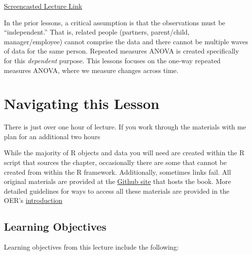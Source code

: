 \documentclass[
  11pt,
]{book}
\begin{document}
\href{https://spu.hosted.panopto.com/Panopto/Pages/Viewer.aspx?pid=c8f5737f-d00d-4fa4-ba3c-ad8b01762258}{Screencasted Lecture Link}

In the prior lessons, a critical assumption is that the observations must be ``independent.'' That is, related people (partners, parent/child, manager/employee) cannot comprise the data and there cannot be multiple waves of data for the same person. Repeated measures ANOVA is created specifically for this \emph{dependent} purpose. This lessons focuses on the one-way repeated measures ANOVA, where we measure changes across time.

\hypertarget{navigating-this-lesson-7}{%
\section{Navigating this Lesson}\label{navigating-this-lesson-7}}

There is just over one hour of lecture. If you work through the materials with me plan for an additional two hours

While the majority of R objects and data you will need are created within the R script that sources the chapter, occasionally there are some that cannot be created from within the R framework. Additionally, sometimes links fail. All original materials are provided at the \href{https://github.com/lhbikos/ReCenterPsychStats}{Github site} that hosts the book. More detailed guidelines for ways to access all these materials are provided in the OER's \protect\hyperlink{ReCintro}{introduction}

\hypertarget{learning-objectives-7}{%
\subsection{Learning Objectives}\label{learning-objectives-7}}

Learning objectives from this lecture include the following:
\end{document}

